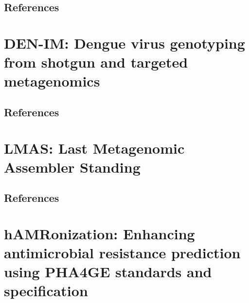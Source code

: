 \documentclass[12pt,a4paper,twoside,openright]{book}
\begin{document}
\begin{sloppy}
\begin{refsection}
\section{References}
\printbibliography[heading=none]
\end{refsection}

\newpage
\thispagestyle{empty}
\chapter{DEN-IM: Dengue virus genotyping from shotgun and targeted metagenomics\label{ch:paper3}}

\thispagestyle{empty}
\clearpage \thispagestyle{empty}\mbox{}\clearpage
\newpage
\begin{refsection}

\newpage
\section{References}
\printbibliography[heading=none]
\end{refsection}

\newpage
\thispagestyle{empty}
\chapter{LMAS: Last Metagenomic Assembler Standing\label{ch:paper4}}

\thispagestyle{empty}
\clearpage \thispagestyle{empty}\mbox{}\clearpage
\newpage
\begin{refsection}

\newpage
\section{References}
\printbibliography[heading=none]
\end{refsection}


\newpage
\thispagestyle{empty}
\chapter{hAMRonization: Enhancing antimicrobial resistance prediction using PHA4GE standards and specification\label{ch:paper5}}


\end{sloppy}
\end{document}
